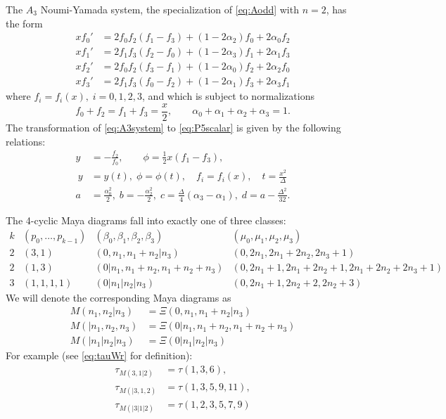 \documentclass{amsart}
\theoremstyle{definition}
\begin{document}
The $A_3$ Noumi-Yamada system, the specialization of \eqref{eq:Aodd}
with $n=2$, has the form
\begin{equation}
  \label{eq:A3system}
  \begin{aligned}
    x f_0'  &= 2 f_0 f_2 (f_1-f_3) + (1-2\alpha_2) f_0 + 2 \alpha_0 f_2 \\
    x f_1'  &= 2 f_1 f_3 (f_2-f_0) + (1-2\alpha_3) f_1 + 2 \alpha_1 f_3 \\
    x f_2'  &= 2 f_0 f_2 (f_3-f_1) + (1-2\alpha_0) f_2 + 2 \alpha_2 f_0 \\
    x f_3'  &= 2 f_1 f_3 (f_0-f_2) + (1-2\alpha_1) f_3 + 2 \alpha_3 f_1 
  \end{aligned}
\end{equation}
where $f_i=f_i(x),\; i=0,1,2,3$, and which is
subject to normalizations
\begin{equation}
  \label{eq:A3norm}
  f_0 + f_2 = f_1+ f_3 = \frac{x}{2} ,\qquad \alpha_0 + \alpha_1 +
  \alpha_2 + \alpha_3 = 1.
\end{equation}
The transformation of \eqref{eq:A3system} to \eqref{eq:P5scalar} is
given by the following relations:
\begin{equation}
  \label{eq:yP5fromf}
  \begin{aligned}
    y &= -\frac{f_2}{f_0},\qquad \phi=\frac12 x (f_1-f_3) ,\\\
    y&=y(t),\;\phi=\phi(t),\quad f_{i} = f_{i}(x),\quad t=
    \frac{x^2}{\Delta}\\
    a &= \frac{\alpha_0^2}{2},\; b= -\frac{\alpha_2^2}{2},\;
    c= \frac{\Delta}{4}(\alpha_3-\alpha_1) ,\; d=a
    -\frac{\Delta^2}{32}.
  \end{aligned}
\end{equation}



The 4-cyclic Maya diagrams fall into exactly one of three classes:
\[
  \begin{array}{cccc}
    k & (p_0,\ldots, p_{k-1})& (\beta_0,\beta_1, \beta_2,\beta_3)
    &  (\mu_0,\mu_1, \mu_{2},\mu_3)     \\
    2 &(3,1)& (0,n_1,n_1+n_2|n_3) & (0,2n_1, 2n_1+2n_2,2n_3+1) \\
    2 &(1,3)& (0|n_1,n_1+n_2,n_1+n_2+n_3)
    & (0,2n_1+1,2n_1+2n_2+1,2n_1+2n_2+2n_3+1)    \\ 
    3 &(1,1,1,1) & (0|n_1|n_2|n_3)
      &(0,2n_1+1, 2n_2+2,2n_2+3)
\end{array}
\]
We will denote the corresponding Maya diagrams as
\begin{align*}
  M(n_1,n_2|n_3)  &= \Xi(0,n_1,n_1+n_2|n_3)\\
  M(|n_1,n_2,n_3)&= \Xi(0|n_1,n_1+n_2,n_1+n_2+n_3)\\
  M(|n_1|n_2|n_3)&= \Xi(0|n_1|n_2|n_3)
\end{align*}
For example (see \eqref{eq:tauWr} for definition):
\begin{align*}
  \tau_{M(3,1|2)} &= \tau(1,3,6),\\
  \tau_{M(|3,1,2)} &= \tau(1,3,5,9,11),\\
  \tau_{M(|3|1|2)} &= \tau(1,2,3,5,7,9)
\end{align*}
\end{document}

